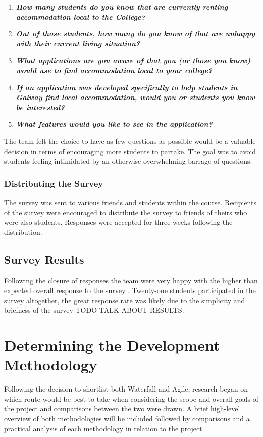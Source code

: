 \begin{enumerate}
    \item\textit{\textbf{How many students do you know that are currently renting accommodation local to the College?}}
    \item\textit{\textbf{Out of those students, how many do you know of that are unhappy with their current living situation?}}
    \item\textit{\textbf{What applications are you aware of that you (or those you know) would use to find accommodation local to your college?}}
    \item\textit{\textbf{If an application was developed specifically to help students in Galway find local accommodation, would you or students you know be interested?}}
    \item\textit{\textbf{What features would you like to see in the application?}}
\end{enumerate}

The team felt the choice to have as few questions as possible would be a valuable decision in terms of encouraging more students to partake. The goal was to avoid students feeling intimidated by an otherwise overwhelming barrage of questions.

\subsubsection{Distributing the Survey}
The survey was sent to various friends and students within the course. Recipients of the survey were encouraged to distribute the survey to friends of theirs who were also students. Responses were accepted for three weeks following the distribution. 

\subsection{Survey Results}
Following the closure of responses the team were very happy with the higher than expected overall response to the survey \cite{SURVEY}. Twenty-one students participated in the survey altogether, the great response rate was likely due to the simplicity and briefness of the survey TODO TALK ABOUT RESULTS. 

\section{Determining the Development Methodology}
Following the decision to shortlist both Waterfall and Agile, research began on which route would be best to take when considering the scope and overall goals of the project and comparisons between the two were drawn. A brief high-level overview of both methodologies will be included followed by comparisons and a practical analysis of each methodology in relation to the project.


